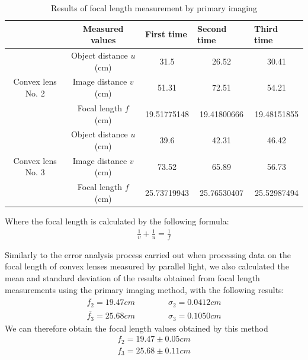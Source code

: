 \documentclass[UTF8]{article}
\begin{document}
    \begin{table}[H]
      \centering
      \caption{Results of focal length measurement by primary imaging}
        \begin{tabular}{ccccc}
        \toprule[2pt]
              & Measured values & \multicolumn{1}{l}{First time} &
              \multicolumn{1}{l}{Second time} & \multicolumn{1}{l}{Third time} \\
              \midrule
        \multirow{3}[4]{*}{Convex lens No. 2} & Object distance $u$(cm) & 31.5  & 26.52 & 30.41 \\
         \cmidrule{2-5}     & Image distance $v$(cm) & 51.31 & 72.51 & 54.21 \\
          \cmidrule{2-5}    & Focal length $f$(cm) & 19.51775148 & 19.41800666 & 19.48151855 \\
          \midrule
        \multirow{3}[4]{*}{Convex lens No. 3} & Object distance $u$(cm) & 39.6  & 42.31 & 46.42 \\
         \cmidrule{2-5}     & Image distance $v$(cm) & 73.52 & 65.89 & 56.73 \\
         \cmidrule{2-5}     & Focal length $f$(cm) & 25.73719943 & 25.76530407 & 25.52987494 \\
         \bottomrule[2pt]
        \end{tabular}%
      \label{tab:addlabel}%
    \end{table}%
    
    Where the focal length is calculated by the following formula:
    \begin{eqnarray}
        \frac{1}{\upsilon } +\frac{1}{u}  =  \frac{1}{f}  
        \end{eqnarray}
        
    Similarly to the error analysis process carried out when processing data on the focal length of convex lenses measured by parallel light, we also calculated the mean and standard deviation of the results obtained from focal length measurements using the primary imaging method, with the following results:
    \begin{align*}
     \overline{f_2}  =  19.47cm \qquad \qquad \sigma _2  = 0.0412cm\\
     \overline{f_3}  =  25.68cm \qquad \qquad \sigma _3  = 0.1050cm
    \end{align*}
    We can therefore obtain the focal length values obtained by this method
    \begin{align*}
    f_2 = 19.47\pm 0.05cm\\
    f_3 = 25.68  \pm 0.11cm
    \end{align*}
    
\end{document}
